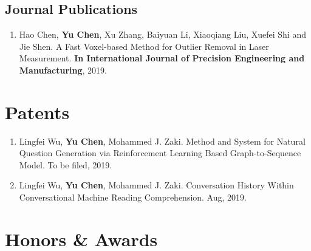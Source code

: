 \documentclass[11pt,a4paper,sans]{moderncv} %
\begin{document}
\subsection{Journal Publications}

{\footnotesize
\begin{enumerate}
\item Hao Chen, \textbf{Yu Chen}, Xu Zhang, Baiyuan Li, Xiaoqiang Liu, Xuefei Shi and Jie Shen. A Fast Voxel-based Method for Outlier Removal in Laser Measurement. \textbf{In International Journal of Precision Engineering and Manufacturing}, 2019. 
\end{enumerate}
}

\section{Patents}
{\footnotesize
\begin{enumerate}



\item Lingfei Wu, \textbf{Yu Chen}, Mohammed J. Zaki. Method and System for Natural Question Generation via Reinforcement Learning Based Graph-to-Sequence Model. To be filed, 2019.
\item Lingfei Wu, \textbf{Yu Chen}, Mohammed J. Zaki. Conversation History Within Conversational Machine Reading Comprehension. Aug, 2019.

\end{enumerate}
}



\section{Honors \& Awards}


\end{document}
